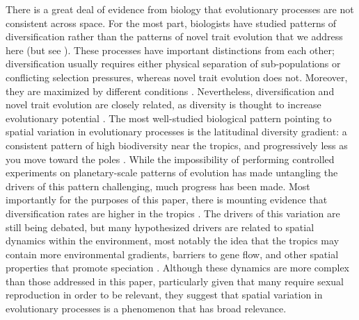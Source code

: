There is a great deal of evidence from biology that evolutionary processes are not consistent across space. For the most part, biologists have studied patterns of diversification rather than the patterns of novel trait evolution that we address here (but see \citep{baym_spatiotemporal_2016}). These processes have important distinctions from each other; diversification usually requires either physical separation of sub-populations or conflicting selection pressures, whereas novel trait evolution does not. Moreover, they are maximized by different conditions \citep{walker_evolutionary_2012}. Nevertheless, diversification and novel trait evolution are closely related, as diversity is thought to increase evolutionary potential \citep{rouzic_evolutionary_2008}. The most well-studied biological pattern pointing to spatial variation in evolutionary processes is the latitudinal diversity gradient: a consistent pattern of high biodiversity near the tropics, and progressively less as you move toward the poles \citep{hillebrand_generality_2004}. While the impossibility of performing controlled experiments on planetary-scale patterns of evolution has made untangling the drivers of this pattern challenging, much progress has been made. Most importantly for the purposes of this paper, there is mounting evidence that diversification rates are higher in the tropics \citep{mittelbach_evolution_2007}. The drivers of this variation are still being debated, but many hypothesized drivers are related to spatial dynamics within the environment, most notably the idea that the tropics may contain more environmental gradients, barriers to gene flow, and other spatial properties that promote speciation \citep{moritz_diversification_2000,doebeli_speciation_2003}. Although these dynamics are more complex than those addressed in this paper, particularly given that many require sexual reproduction in order to be relevant, they suggest that spatial variation in evolutionary processes is a phenomenon that has broad relevance.
% 
%

